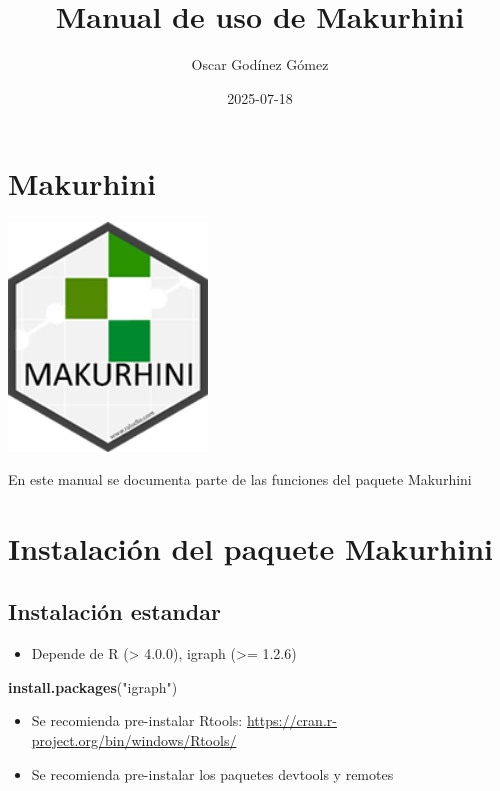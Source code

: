 \documentclass[
]{book}
\title{Manual de uso de Makurhini}
\author{Oscar Godínez Gómez}
\date{2025-07-18}
\newenvironment{Shaded}{\begin{snugshade}}{\end{snugshade}}
\newcommand{\FunctionTok}[1]{\textcolor[rgb]{0.13,0.29,0.53}{\textbf{#1}}}
\newcommand{\NormalTok}[1]{#1}
\newcommand{\StringTok}[1]{\textcolor[rgb]{0.31,0.60,0.02}{#1}}
\providecommand{\tightlist}{%
  \setlength{\itemsep}{0pt}\setlength{\parskip}{0pt}}
\begin{document}
\maketitle

{
\setcounter{tocdepth}{1}
\tableofcontents
}
\chapter*{Makurhini}\label{makurhini}

\includegraphics[width=2.08333in,height=\textheight,keepaspectratio]{LOGO_MAKHURINI.png}

En este manual se documenta parte de las funciones del paquete Makurhini

\chapter{Instalación del paquete Makurhini}\label{instalaciuxf3n-del-paquete-makurhini}

\section{Instalación estandar}\label{instalaciuxf3n-estandar}

\begin{itemize}
\tightlist
\item
  Depende de R (\textgreater{} 4.0.0), igraph (\textgreater= 1.2.6)
\end{itemize}

\begin{Shaded}
\begin{Highlighting}[]
\FunctionTok{install.packages}\NormalTok{(}\StringTok{"igraph"}\NormalTok{)}
\end{Highlighting}
\end{Shaded}

\begin{itemize}
\item
  Se recomienda pre-instalar Rtools:
  \url{https://cran.r-project.org/bin/windows/Rtools/}
\item
  Se recomienda pre-instalar los paquetes devtools y remotes
\end{itemize}
\end{document}

